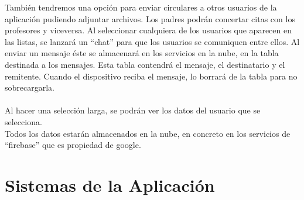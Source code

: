 Tambi\'en tendremos una opci\'on para enviar circulares a otros usuarios de la aplicaci\'on pudiendo adjuntar archivos. Los padres podr\'an concertar citas con los profesores y viceversa.
Al seleccionar cualquiera de los usuarios que aparecen en las listas, se lanzar\'a un ``chat'' para que los usuarios se comuniquen entre ellos. Al enviar un mensaje \'este se almacenar\'a en los servicios en la nube, en la tabla destinada a los mensajes. Esta tabla contendr\'a el mensaje, el destinatario y el remitente. Cuando el dispositivo reciba el mensaje, lo borrar\'a de la tabla para no sobrecargarla.\\
\\
Al hacer una selecci\'on larga, se podr\'an ver los datos del usuario que se selecciona.
\\
Todos los datos estar\'an almacenados en la nube, en concreto en los servicios de ``firebase'' que es propiedad de google.

\section{Sistemas de la Aplicaci\'on}


